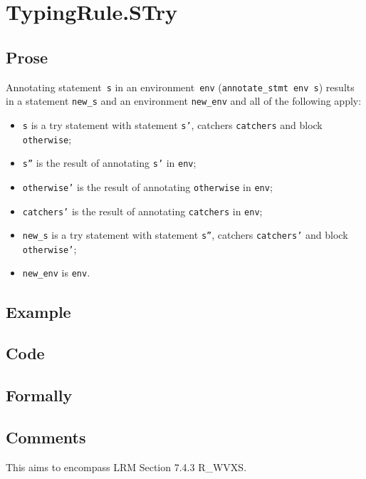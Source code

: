 \documentclass{book}
\begin{document}
\section{TypingRule.STry \label{sec:TypingRule.STry}}

  \subsection{Prose}
Annotating statement~\texttt{s} in an environment~\texttt{env}
(\texttt{annotate\_stmt env s}) results in a statement \texttt{new\_s} and an
environment \texttt{new\_env} and all of the following apply:
   \begin{itemize}
   \item \texttt{s} is a try statement with statement \texttt{s'}, catchers \texttt{catchers} and block \texttt{otherwise};
   \item \texttt{s''} is the result of annotating \texttt{s'} in \texttt{env};
   \item \texttt{otherwise'} is the result of annotating \texttt{otherwise} in \texttt{env};
   \item \texttt{catchers'} is the result of annotating \texttt{catchers} in \texttt{env};
   \item \texttt{new\_s} is a try statement with statement \texttt{s''}, catchers \texttt{catchers'} and block \texttt{otherwise'};
   \item \texttt{new\_env} is \texttt{env}.
   \end{itemize}

  \subsection{Example}

  \subsection{Code}

\begin{emptyformal}
    \subsection{Formally}
\end{emptyformal}

\subsection{Comments}
    This aims to encompass LRM Section 7.4.3 R\_WVXS.
\end{document}
